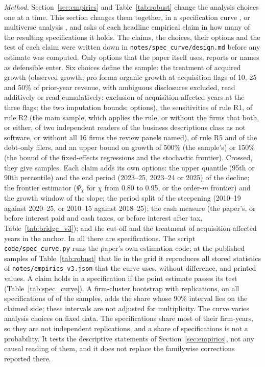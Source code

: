 \emph{Method.} Section~\ref{sec:empirics} and Table~\ref{tab:robust} change the analysis choices one at a time. This section changes them together, in a specification curve \citep{simonsohn2020specification}, or multiverse analysis \citep{steegen2016increasing}, and asks of each headline empirical claim in how many of the resulting specifications it holds. The claims, the choices, their options and the test of each claim were written down in \texttt{notes/spec\_curve/design.md} before any estimate was computed. Only options that the paper itself uses, reports or names as defensible enter. Six choices define the sample: the treatment of acquired growth (observed growth; pro forma organic growth at acquisition flags of 10, 25 and 50\% of prior-year revenue, with ambiguous disclosures excluded, read additively or read cumulatively; exclusion of acquisition-affected years at the three flags; the two imputation bounds; \ScNAcq{} options), the sensitivities of rule R1, of rule R2 (the main sample, which applies the rule, or without the firms that both, or either, of two independent readers of the business descriptions class as not software, or without all 16 firms the review panels named), of rule R5 and of the debt-only filers, and an upper bound on growth of 500\% (the sample's) or 150\% (the bound of the fixed-effects regressions and the stochastic frontier). Crossed, they give \ScNSamples{} samples. Each claim adds its own options: the upper quantile (95th or 90th percentile) and the end period (2023--25, 2023--24 or 2025) of the decline; the frontier estimator ($\Psi_\chi$ for $\chi$ from 0.80 to 0.95, or the order-$m$ frontier) and the growth window of the slope; the period split of the steepening (2010--19 against 2020--25, or 2010--15 against 2018--25); the cash measure (the paper's, or before interest paid and cash taxes, or before interest after tax, Table~\ref{tab:bridge_v3}); and the cut-off and the treatment of acquisition-affected years in the anchor. In all there are \ScNSpecs{} specifications. The script \texttt{code/spec\_curve.py} runs the paper's own estimation code; at the \ScReproVariants{} published samples of Table~\ref{tab:robust} that lie in the grid it reproduces all \ScReproN{} stored statistics of \texttt{notes/empirics\_v3.json} that the curve uses, without difference, and \ScReproMacros{} printed values. A claim holds in a specification if the point estimate passes its test (Table~\ref{tab:spec_curve}). A firm-cluster bootstrap with \ScBootB{} replications, on all specifications of \ScBootK{} of the samples, adds the share whose 90\% interval lies on the claimed side; these intervals are not adjusted for multiplicity. The curve varies analysis choices on fixed data. The specifications share most of their firm-years, so they are not independent replications, and a share of specifications is not a probability. It tests the descriptive statements of Section~\ref{sec:empirics}, not any causal reading of them, and it does not replace the familywise corrections reported there.

